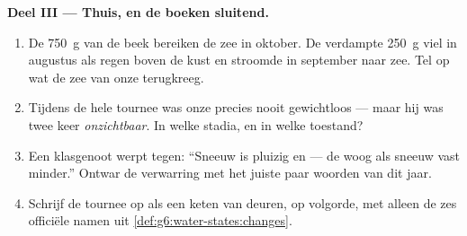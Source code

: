 \begin{problem}
\medskip\noindent\textbf{Deel III --- Thuis, en de boeken sluitend.}
\begin{enumerate}[resume]
  \item De \qty{750}{g} van de beek bereiken de zee in oktober. De
        verdampte \qty{250}{g} viel in augustus als regen boven de
        kust en stroomde in september naar zee. Tel op wat de zee van
        onze  terugkreeg.
  \item Tijdens de hele tournee was onze  precies nooit
        gewichtloos --- maar hij was twee keer \emph{onzichtbaar}. In
        welke stadia, en in welke toestand?
  \item Een klasgenoot werpt tegen: ``Sneeuw is pluizig en  ---
        de  woog als sneeuw vast minder.'' Ontwar de
        verwarring met het juiste paar woorden van dit jaar.
  \item Schrijf de tournee op als een keten van deuren, op volgorde,
        met alleen de zes officiële namen uit
        \cref{def:g6:water-states:changes}.
\end{enumerate}
\end{problem}
